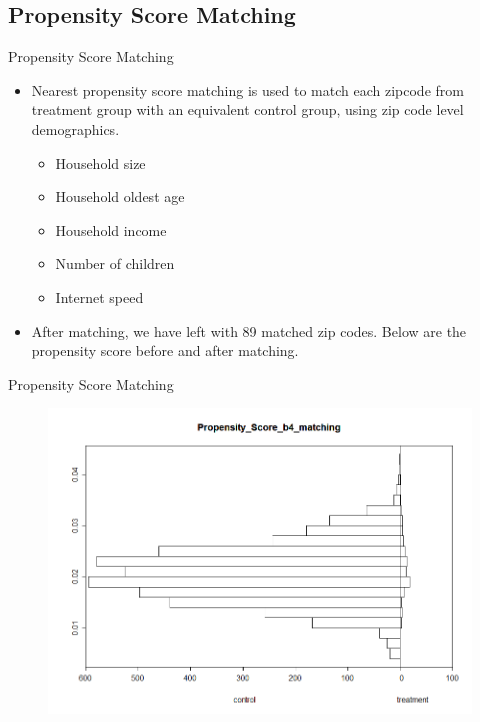 \documentclass[mathserif, xcolor=table]{beamer}
\begin{document}
\subsection{Propensity Score Matching}
\begin{frame}{Propensity Score Matching}
	\begin{itemize}
		\item Nearest propensity score matching is used to match each zipcode from treatment group with an equivalent control group, using zip code level demographics. 
		\begin{itemize}
			\item Household size
			\item Household oldest age
			\item Household income
			\item Number of children
			\item Internet speed
		\end{itemize}
		\item After matching, we have left with 89 matched zip codes. Below are the propensity score before and after matching.
	\end{itemize}
\end{frame}

\begin{frame}{Propensity Score Matching}
	\begin{figure}
		\centering
		\includegraphics[width=\textwidth]{pic/b4matching.png}
	\end{figure}
\end{frame}
\end{document}
